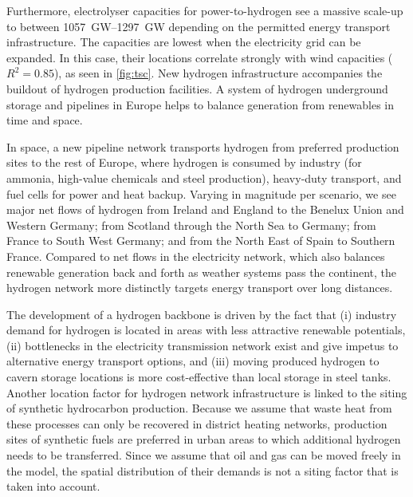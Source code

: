 Furthermore, electrolyser capacities for power-to-hydrogen see a massive
scale-up to between \SIrange{1057}{1297}{\giga\watt} depending on the permitted
energy transport infrastructure. The capacities are lowest when the electricity
grid can be expanded. In this case, their locations correlate strongly with wind
capacities ($R^2=0.85$), as seen in \cref{fig:tsc}. New hydrogen infrastructure
accompanies the buildout of hydrogen production facilities. A system of hydrogen
underground storage and pipelines in Europe helps to balance generation from
renewables in time and space.


In space, a new pipeline network transports hydrogen from preferred production
sites to the rest of Europe, where hydrogen is consumed by industry (for
ammonia, high-value chemicals and steel production), heavy-duty transport, and
fuel cells for power and heat backup. Varying in magnitude per scenario, we see
major net flows of hydrogen from Ireland and England to the Benelux Union and
Western Germany; from Scotland through the North Sea to Germany; from France to
South West Germany; and from the North East of Spain to Southern France.
Compared to net flows in the electricity network, which also balances renewable
generation back and forth as weather systems pass the continent, the hydrogen
network more distinctly targets energy transport over long distances.




The development of a hydrogen backbone is driven by the fact that (i) industry
demand for hydrogen is located in areas with less attractive renewable
potentials, (ii) bottlenecks in the electricity transmission network exist and
give impetus to alternative energy transport options, and (iii) moving produced
hydrogen to cavern storage locations is more cost-effective than local storage
in steel tanks. Another location factor for hydrogen network infrastructure is
linked to the siting of synthetic hydrocarbon production. Because we assume that
waste heat from these processes can only be recovered in district heating
networks, production sites of synthetic fuels are preferred in urban areas to
which additional hydrogen needs to be transferred. Since we assume that oil and
gas can be moved freely in the model, the spatial distribution of their demands
is not a siting factor that is taken into account.

